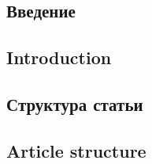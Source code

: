 \begin{Russian}
\section{Введение}
\end{Russian}
\begin{English}
\section{Introduction}
\end{English}
\label{sec:intro}

\begin{Russian}

\end{Russian}
\begin{English}

\end{English}

\begin{Russian}
\end{Russian}
\begin{English}
\end{English}


\begin{Russian}
\subsection{Структура статьи}
\end{Russian}
\begin{English}
\subsection{Article structure}
\end{English}
\label{sec:structure}


